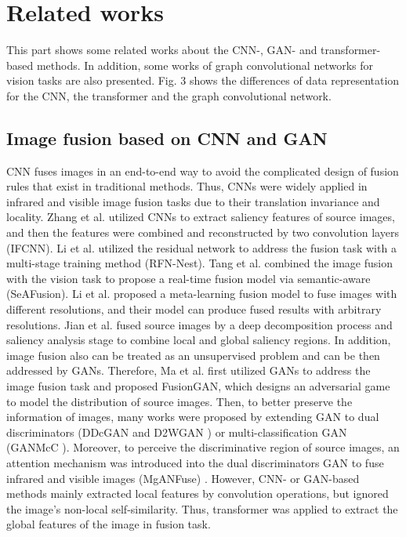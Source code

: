 \documentclass[journal]{IEEEtran}
\begin{document}
\section{Related works}
\label{}
This part shows some related works about the CNN-, GAN- and transformer-based methods. In addition, some works of graph convolutional networks for vision tasks are also presented. Fig. 3 shows the differences of data representation for the CNN, the transformer and the graph convolutional network.

\subsection{Image fusion based on CNN and GAN}
CNN fuses images in an end-to-end way to avoid the complicated design of fusion rules that exist in traditional methods. Thus, CNNs were widely applied in infrared and visible image fusion tasks due to  their translation invariance and locality. Zhang et al. \cite{zhang2020ifcnn} utilized CNNs to extract saliency features of source images, and then the features were combined and reconstructed by two convolution layers (IFCNN). Li et al. \cite{li2021rfn} utilized the residual network to address the fusion task with a multi-stage training method (RFN-Nest). Tang et al. \cite{tang2022image} combined the image fusion with the vision task to propose a real-time fusion model via semantic-aware (SeAFusion). Li et al. \cite{li2021different} proposed a meta-learning fusion model to fuse images with different resolutions, and their model can produce fused results with arbitrary resolutions. Jian et al. \cite{jian2021infrared} fused source images by a deep decomposition process and saliency analysis stage to combine local and global saliency regions. In addition, image fusion also can be treated as an unsupervised problem and can be then addressed by GANs. Therefore, Ma et al. \cite{ma2019fusiongan} first utilized GANs to address the image fusion task and proposed FusionGAN, which designs an adversarial game to model the distribution of source images. Then, to better preserve the information of images, many works were proposed by extending GAN to dual discriminators (DDcGAN \cite{ma2020ddcgan} and D2WGAN \cite{li2020infrared}) or multi-classification GAN (GANMcC \cite{ma2020ganmcc}). Moreover, to perceive the discriminative region of source images, an attention mechanism was introduced into the dual discriminators GAN to fuse infrared and visible images (MgANFuse) \cite{li2020multigrained}. However, CNN- or GAN-based methods mainly extracted local features by convolution operations, but ignored the image's non-local self-similarity. Thus, transformer was applied to extract the global features of the image in fusion task.
\end{document}
